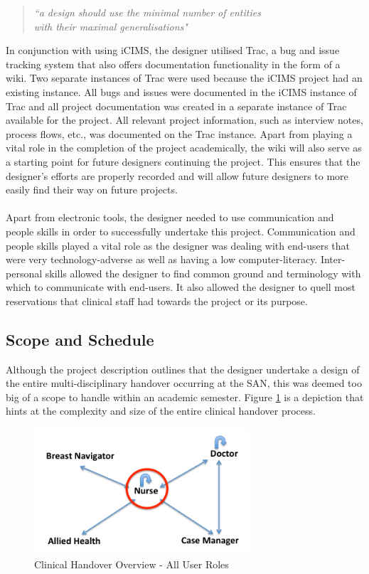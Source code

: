 \begin{quote}
\center\emph{``a design should use the minimal number of entities \\ with their maximal generalisations"}
\end{quote}
\vspace{6mm}
\noindent In conjunction with using iCIMS, the designer utilised Trac, a bug and issue tracking system that also offers documentation functionality in the form of a wiki. Two separate instances of Trac were used because the iCIMS project had an existing instance. All bugs and issues were documented in the iCIMS instance of Trac and all project documentation was created in a separate instance of Trac available for the project. All relevant project information, such as interview notes, process flows, etc., was documented on the Trac instance. Apart from playing a vital role in the completion of the project academically, the wiki will also serve as a starting point for future designers continuing the project. This ensures that the designer's efforts are properly recorded and will allow future designers to more easily find their way on future projects.
\\ \\
Apart from electronic tools, the designer needed to use communication and people skills in order to successfully undertake this project. Communication and people skills played a vital role as the designer was dealing with end-users that were very technology-adverse as well as having a low computer-literacy. Inter-personal skills allowed the designer to find common ground and terminology with which to communicate with end-users. It also allowed the designer to quell most reservations that clinical staff had towards the project or its purpose.

\newpage
\subsection{Scope and Schedule}
Although the project description outlines that the designer undertake a design of the entire multi-disciplinary handover occurring at the SAN, this was deemed too big of a scope to handle within an academic semester. Figure \ref{Clinical Handover Overview - All User Roles} is a depiction that hints at the complexity and size of the entire clinical handover process.

\begin{figure}[hp]
				\centering
				\includegraphics[scale=1.0, width=80mm]{Images/Clinical_Handover_All_Roles}
				\caption{Clinical Handover Overview - All User Roles}
				\label{Clinical Handover Overview - All User Roles}
\end{figure} 

